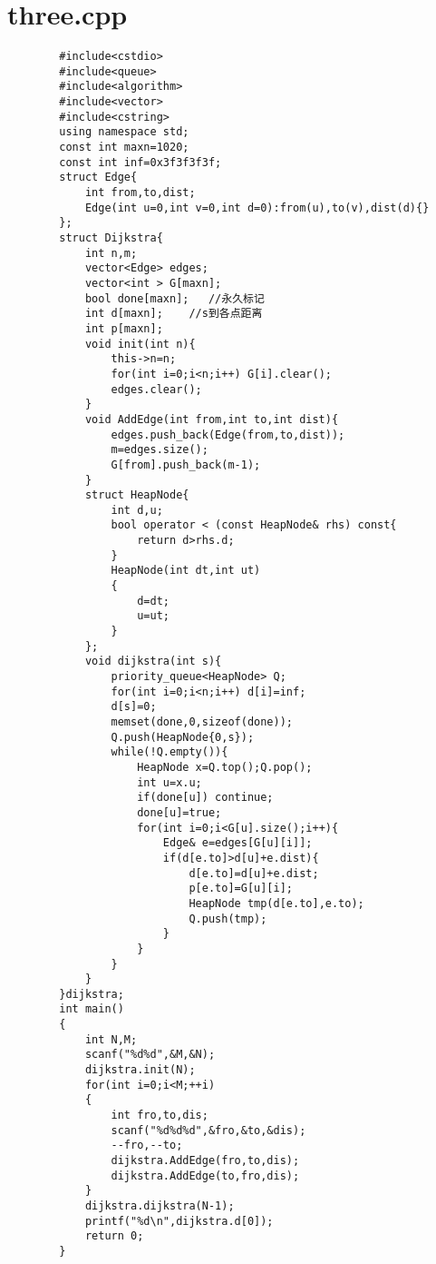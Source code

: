 \documentclass[UTF8]{ctexart}
\begin{document}
    \section{three.cpp}\label{three_cpp}
    \begin{verbatim}
        #include<cstdio>
        #include<queue>
        #include<algorithm>
        #include<vector>
        #include<cstring>
        using namespace std;
        const int maxn=1020;
        const int inf=0x3f3f3f3f;
        struct Edge{
            int from,to,dist;
            Edge(int u=0,int v=0,int d=0):from(u),to(v),dist(d){}
        };
        struct Dijkstra{
            int n,m;
            vector<Edge> edges;
            vector<int > G[maxn];
            bool done[maxn];   //永久标记
            int d[maxn];    //s到各点距离
            int p[maxn];
            void init(int n){
                this->n=n;
                for(int i=0;i<n;i++) G[i].clear();
                edges.clear();
            }
            void AddEdge(int from,int to,int dist){
                edges.push_back(Edge(from,to,dist));
                m=edges.size();
                G[from].push_back(m-1);
            }
            struct HeapNode{
                int d,u;
                bool operator < (const HeapNode& rhs) const{
                    return d>rhs.d;
                }
                HeapNode(int dt,int ut)
                {
                    d=dt;
                    u=ut;
                }
            };
            void dijkstra(int s){
                priority_queue<HeapNode> Q;
                for(int i=0;i<n;i++) d[i]=inf;
                d[s]=0;
                memset(done,0,sizeof(done));
                Q.push(HeapNode{0,s});
                while(!Q.empty()){
                    HeapNode x=Q.top();Q.pop();
                    int u=x.u;
                    if(done[u]) continue;
                    done[u]=true;
                    for(int i=0;i<G[u].size();i++){
                        Edge& e=edges[G[u][i]];
                        if(d[e.to]>d[u]+e.dist){
                            d[e.to]=d[u]+e.dist;
                            p[e.to]=G[u][i];
                            HeapNode tmp(d[e.to],e.to);
                            Q.push(tmp);
                        }
                    }
                }
            }
        }dijkstra;
        int main()
        {
            int N,M;
            scanf("%d%d",&M,&N);
            dijkstra.init(N);
            for(int i=0;i<M;++i)
            {
                int fro,to,dis;
                scanf("%d%d%d",&fro,&to,&dis);
                --fro,--to;
                dijkstra.AddEdge(fro,to,dis);
                dijkstra.AddEdge(to,fro,dis);
            }
            dijkstra.dijkstra(N-1);
            printf("%d\n",dijkstra.d[0]);
            return 0;
        } 
    \end{verbatim}
\end{document}
